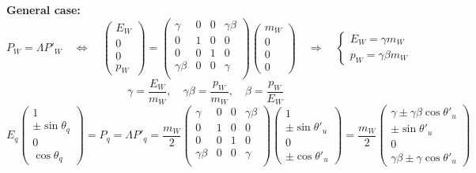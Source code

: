\documentclass[12pt]{article}
\begin{document}

{\bf General case:}
%
\begin{equation}
  P_W = \Lambda P'_W \quad \Leftrightarrow \quad
%
  \begin{pmatrix} E_W\\0\\0\\p_W \end{pmatrix} =
  \begin{pmatrix}
    \gamma & 0 & 0 & \gamma\beta \\
    0 & 1 & 0 & 0 \\
    0 & 0 & 1 & 0 \\
    \gamma\beta & 0 & 0 & \gamma \\
  \end{pmatrix}
  \begin{pmatrix} m_W\\0\\0\\0 \end{pmatrix}
  \quad \Rightarrow \quad
%
  \left\{\begin{array}{l}
    E_W = \gamma m_W \\
    p_W = \gamma\beta m_W
  \end{array}\right.
\end{equation}
\begin{equation}
  \gamma = \frac{E_W}{m_W}, \quad
  \gamma\beta = \frac{p_W}{m_W}, \quad
  \beta = \frac{p_W}{E_W}
\end{equation}
%
\begin{equation}
  E_q \begin{pmatrix}
    1 \\
    \pm\sin\theta_q \\
    0 \\
    \cos\theta_q
  \end{pmatrix} =
  P_q = \Lambda P'_q =
  \frac{m_W}{2}
  \begin{pmatrix}
    \gamma & 0 & 0 & \gamma\beta \\
    0 & 1 & 0 & 0 \\
    0 & 0 & 1 & 0 \\
    \gamma\beta & 0 & 0 & \gamma \\
  \end{pmatrix}
  \begin{pmatrix} 1\\ \pm\sin\theta'_u\\ 0\\ \pm\cos\theta'_u \end{pmatrix}
  = \frac{m_W}{2}
  \begin{pmatrix}
    \gamma \pm \gamma\beta\cos\theta'_u \\
    \pm\sin\theta'_u \\
    0 \\
    \gamma\beta \pm \gamma\cos\theta'_u
  \end{pmatrix}
\end{equation}
\end{document}
